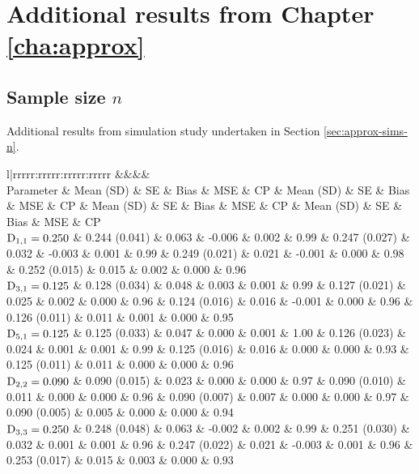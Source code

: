 \section{Additional results from Chapter \ref{cha:approx}}\label{sec:appendix-MVJM-results}
\clearpage
{}
\thispagestyle{empty}
\begin{landscape}
\subsection{Sample size \texorpdfstring{$n$}{n}}\label{sec:appendix-MVJMresults-sims-n}
Additional results from simulation study undertaken in Section \ref{sec:approx-sims-n}. 
\begin{table}[ht]
\centering
{}
\captionsetup{font=scriptsize}
\begingroup\tiny
\begin{tabular}{l|rrrrr:rrrrr:rrrrr:rrrrr}
  &&&&\\
Parameter & Mean (SD) & SE & Bias & MSE & CP & Mean (SD) & SE & Bias & MSE & CP & Mean (SD) & SE & Bias & MSE & CP & Mean (SD) & SE & Bias & MSE & CP \\ 
  \hline
$\mathrm{D}_{1,1} = 0.250$ &  0.244 (0.041) & 0.063 & -0.006 & 0.002 & 0.99 &  0.247 (0.027) & 0.032 & -0.003 & 0.001 & 0.99 &  0.249 (0.021) & 0.021 & -0.001 & 0.000 & 0.98 &  0.252 (0.015) & 0.015 &  0.002 & 0.000 & 0.96 \\ 
  $\mathrm{D}_{3,1} = 0.125$ &  0.128 (0.034) & 0.048 &  0.003 & 0.001 & 0.99 &  0.127 (0.021) & 0.025 &  0.002 & 0.000 & 0.96 &  0.124 (0.016) & 0.016 & -0.001 & 0.000 & 0.96 &  0.126 (0.011) & 0.011 &  0.001 & 0.000 & 0.95 \\ 
  $\mathrm{D}_{5,1} = 0.125$ &  0.125 (0.033) & 0.047 &  0.000 & 0.001 & 1.00 &  0.126 (0.023) & 0.024 &  0.001 & 0.001 & 0.99 &  0.125 (0.016) & 0.016 &  0.000 & 0.000 & 0.93 &  0.125 (0.011) & 0.011 &  0.000 & 0.000 & 0.96 \\ 
  $\mathrm{D}_{2,2} = 0.090$ &  0.090 (0.015) & 0.023 &  0.000 & 0.000 & 0.97 &  0.090 (0.010) & 0.011 &  0.000 & 0.000 & 0.96 &  0.090 (0.007) & 0.007 &  0.000 & 0.000 & 0.97 &  0.090 (0.005) & 0.005 &  0.000 & 0.000 & 0.94 \\ 
  $\mathrm{D}_{3,3} = 0.250$ &  0.248 (0.048) & 0.063 & -0.002 & 0.002 & 0.99 &  0.251 (0.030) & 0.032 &  0.001 & 0.001 & 0.96 &  0.247 (0.022) & 0.021 & -0.003 & 0.001 & 0.96 &  0.253 (0.017) & 0.015 &  0.003 & 0.000 & 0.93 \\ 

\end{tabular}
\end{table}
\end{landscape}
